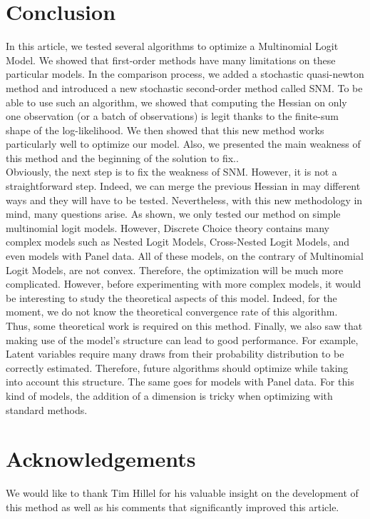 \documentclass[conference]{IEEEtran}
\begin{document}
\section{Conclusion}
\label{sec:conclusion}

In this article, we tested several algorithms to optimize a Multinomial Logit Model. We showed that first-order methods have many limitations on these particular models. In the comparison process, we added a stochastic quasi-newton method and introduced a new stochastic second-order method called SNM. To be able to use such an algorithm, we showed that computing the Hessian on only one observation (or a batch of observations) is legit thanks to the finite-sum shape of the log-likelihood. We then showed that this new method works particularly well to optimize our model. Also, we presented the main weakness of this method and the beginning of the solution to fix.. \\

Obviously, the next step is to fix the weakness of SNM. However, it is not a straightforward step. Indeed, we can merge the previous Hessian in may different ways and they will have to be tested. Nevertheless, with this new methodology in mind, many questions arise. As shown, we only tested our method on simple multinomial logit models. However, Discrete Choice theory contains many complex models such as Nested Logit Models, Cross-Nested Logit Models, and even models with Panel data. All of these models, on the contrary of Multinomial Logit Models, are not convex. Therefore, the optimization will be much more complicated. However, before experimenting with more complex models, it would be interesting to study the theoretical aspects of this model. Indeed, for the moment, we do not know the theoretical convergence rate of this algorithm. Thus, some theoretical work is required on this method. Finally, we also saw that making use of the model's structure can lead to good performance. For example, Latent variables require many draws from their probability distribution to be correctly estimated. Therefore, future algorithms should optimize while taking into account this structure. The same goes for models with Panel data. For this kind of models, the addition of a dimension is tricky when optimizing with standard methods. 

\section{Acknowledgements} 
\label{sec:acknowledgements}

We would like to thank Tim Hillel for his valuable insight on the development of this method as well as his comments that significantly improved this article.


\end{document}
